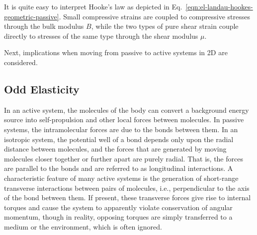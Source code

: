 It is quite easy to interpret Hooke's law as depicted in Eq.~\ref{eqn:el-landau-hookes-geometric-passive}.  Small compressive strains are coupled to compressive stresses through the bulk modulus $B$, while the two types of pure shear strain couple directly to stresses of the same type through the shear modulus $\mu$.

Next, implications when moving from passive to active systems in 2D are considered.

\subsection{Odd Elasticity}

In an active system, the molecules of the body can convert a background energy source into self-propulsion and other local forces between molecules.  In passive systems, the intramolecular forces are due to the bonds between them.  In an isotropic system, the potential well of a bond depends only upon the radial distance between molecules, and the forces that are generated by moving molecules closer together or further apart are purely radial.  That is, the forces are parallel to the bonds and are referred to as longitudinal interactions.  A characteristic feature of many active systems is the generation of short-range transverse interactions between pairs of molecules, i.e., perpendicular to the axis of the bond between them.  If present, these transverse forces give rise to internal torques and cause the system to apparently violate conservation of angular momentum, though in reality, opposing torques are simply transferred to a medium or the environment, which is often ignored.

